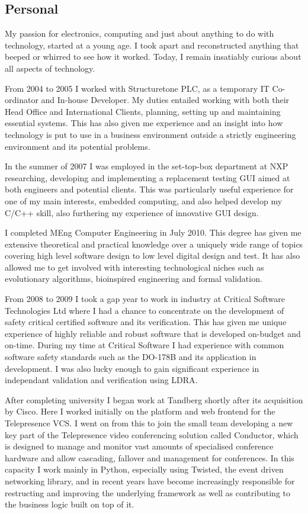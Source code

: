 \documentclass[overlapped,line,letterpaper]{res}
\begin{document}
\begin{resume}
\newpage

\section{\bf{ Personal } }
My passion for electronics, computing and just about anything to do with
technology, started at a young age.
I took apart and reconstructed anything that beeped or whirred to see how it
worked.
Today, I remain insatiably curious about all aspects of technology.

From 2004 to 2005 I worked with Structuretone PLC, as a temporary IT
Co-ordinator and In-house Developer.
My duties entailed working with both their Head Office and International Clients,
planning, setting up and maintaining essential systems.
This has also given me experience and an insight into how technology is put to
use in a business environment outside a strictly engineering environment and its
potential problems.

In the summer of 2007 I was employed in the set-top-box department at NXP
researching, developing and implementing a replacement testing GUI aimed at both
engineers and potential clients.
This was particularly useful experience for one of my main interests, embedded
computing, and also helped develop my C/C++ skill, also furthering my experience
of innovative GUI design.

I completed MEng Computer Engineering in July 2010.
This degree has given me extensive theoretical and practical knowledge over a
uniquely wide range of topics covering high level software design to low level
digital design and test.
It has also allowed me to get involved with interesting technological niches
such as evolutionary algorithms, bioinspired engineering and formal validation.

From 2008 to 2009 I took a gap year to work in industry at Critical Software
Technologies Ltd where I had a chance to concentrate on the development of
safety critical certified software and its verification.
This has given me unique experience of highly reliable and robust software that
is developed on-budget and on-time.
During my time at Critical Software I had experience with common software
safety standards such as the DO-178B and its application in development.
I was also lucky enough to gain significant experience in independant validation
and verification using LDRA.

After completing university I began work at Tandberg shortly after its acquisition
by Cisco.
Here I worked initially on the platform and web frontend for the
Telepresence VCS.
I went on from this to join the small team developing a new key part of the
Telepresence video conferencing solution called Conductor, which is designed
to manage and monitor vast amounts of specialised conference hardware and
allow cascading, fallover and management for conferences.
In this capacity I work mainly in Python, especially
using Twisted, the event driven networking library, and in recent years have become increasingly
responsible for restructing and improving the underlying framework as well as contributing to the business 
logic built on top of it.


\end{resume}
\end{document}
